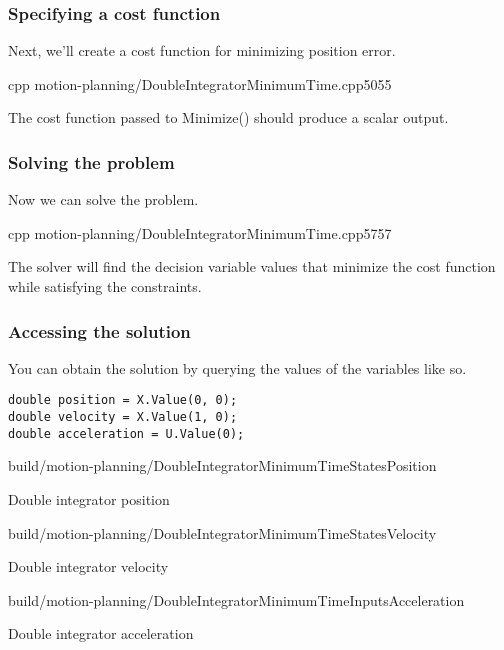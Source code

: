 \subsubsection{Specifying a cost function}

Next, we'll create a cost function for minimizing position error.
\begin{coderemotesubset}{cpp}
  {motion-planning/DoubleIntegratorMinimumTime.cpp}{50}{55}
\end{coderemotesubset}

The cost function passed to Minimize() should produce a scalar output.

\subsubsection{Solving the problem}

Now we can solve the problem.
\begin{coderemotesubset}{cpp}
  {motion-planning/DoubleIntegratorMinimumTime.cpp}{57}{57}
\end{coderemotesubset}

The solver will find the decision variable values that minimize the cost
function while satisfying the constraints.

\subsubsection{Accessing the solution}

You can obtain the solution by querying the values of the variables like so.
\begin{code}
  \begin{lstlisting}[style=customCpp]
double position = X.Value(0, 0);
double velocity = X.Value(1, 0);
double acceleration = U.Value(0);
  \end{lstlisting}
\end{code}
\begin{bookfigure}
  \begin{minisvg}{2}{build/motion-planning/DoubleIntegratorMinimumTimeStatesPosition}
    \caption{Double integrator position}
  \end{minisvg}
  \hfill
  \begin{minisvg}{2}{build/motion-planning/DoubleIntegratorMinimumTimeStatesVelocity}
    \caption{Double integrator velocity}
  \end{minisvg}
  \hfill
  \begin{minisvg}{2}{build/motion-planning/DoubleIntegratorMinimumTimeInputsAcceleration}
    \caption{Double integrator acceleration}
  \end{minisvg}
\end{bookfigure}

